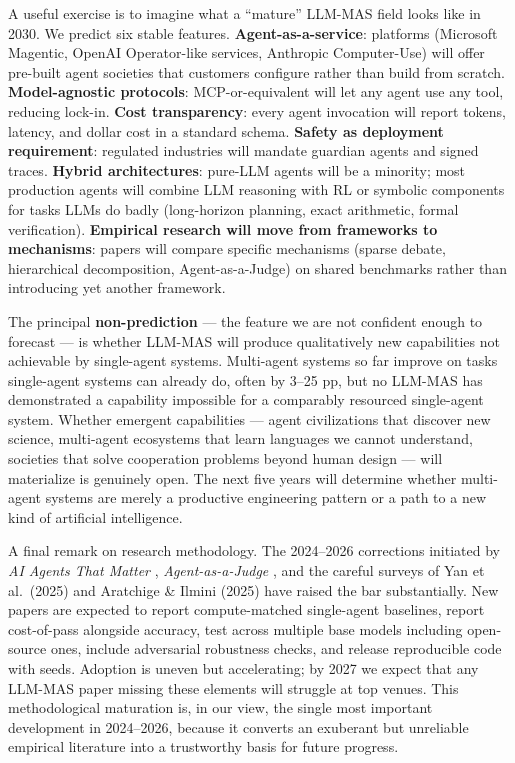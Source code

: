 \documentclass{article}
\begin{document}
A useful exercise is to imagine what a ``mature'' LLM-MAS field looks like in 2030. We predict six stable features. \textbf{Agent-as-a-service}: platforms (Microsoft Magentic, OpenAI Operator-like services, Anthropic Computer-Use) will offer pre-built agent societies that customers configure rather than build from scratch. \textbf{Model-agnostic protocols}: MCP-or-equivalent will let any agent use any tool, reducing lock-in. \textbf{Cost transparency}: every agent invocation will report tokens, latency, and dollar cost in a standard schema. \textbf{Safety as deployment requirement}: regulated industries will mandate guardian agents and signed traces. \textbf{Hybrid architectures}: pure-LLM agents will be a minority; most production agents will combine LLM reasoning with RL or symbolic components for tasks LLMs do badly (long-horizon planning, exact arithmetic, formal verification). \textbf{Empirical research will move from frameworks to mechanisms}: papers will compare specific mechanisms (sparse debate, hierarchical decomposition, Agent-as-a-Judge) on shared benchmarks rather than introducing yet another framework.

The principal \textbf{non-prediction} --- the feature we are not confident enough to forecast --- is whether LLM-MAS will produce qualitatively new capabilities not achievable by single-agent systems. Multi-agent systems so far improve on tasks single-agent systems can already do, often by 3--25 pp, but no LLM-MAS has demonstrated a capability impossible for a comparably resourced single-agent system. Whether emergent capabilities --- agent civilizations that discover new science, multi-agent ecosystems that learn languages we cannot understand, societies that solve cooperation problems beyond human design --- will materialize is genuinely open. The next five years will determine whether multi-agent systems are merely a productive engineering pattern or a path to a new kind of artificial intelligence.

A final remark on research methodology. The 2024--2026 corrections initiated by \emph{AI Agents That Matter} \citep{kapoor2024aiagentsthatmatter}, \emph{Agent-as-a-Judge} \citep{zhuge20242024}, and the careful surveys of Yan et al.~(2025) and Aratchige \& Ilmini (2025) have raised the bar substantially. New papers are expected to report compute-matched single-agent baselines, report cost-of-pass alongside accuracy, test across multiple base models including open-source ones, include adversarial robustness checks, and release reproducible code with seeds. Adoption is uneven but accelerating; by 2027 we expect that any LLM-MAS paper missing these elements will struggle at top venues. This methodological maturation is, in our view, the single most important development in 2024--2026, because it converts an exuberant but unreliable empirical literature into a trustworthy basis for future progress.
\end{document}
